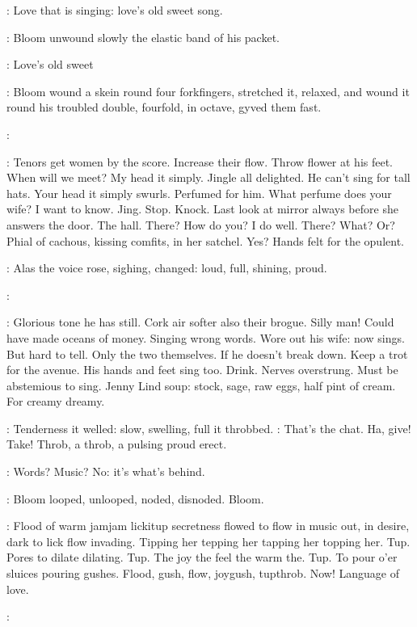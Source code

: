 \BloomInt:
Love that is singing: love's old sweet song.

:
Bloom unwound slowly
the elastic band of his packet.

\BloomInt:
Love's old sweet

:
Bloom
wound a skein round four forkfingers, stretched it, relaxed, and wound it
round his troubled double, fourfold, in octave, gyved them fast.

\simon:

\BloomInt:
Tenors get women by the score. Increase their flow. Throw flower at
his feet. When will we meet? My head it simply. Jingle all delighted. He
can't sing for tall hats. Your head it simply swurls. Perfumed for him.
What perfume does your wife? I want to know. Jing. Stop. Knock. Last look
at mirror always before she answers the door. The hall.
There? How do you?
I do well. There? What? Or? Phial of cachous, kissing comfits, in her
satchel. Yes? Hands felt for the opulent.

:
Alas the voice rose, sighing, changed: loud, full, shining, proud.

\simon:

\BloomInt:
Glorious tone he has still. Cork air softer also their brogue. Silly man!
Could have made oceans of money. Singing wrong words. Wore out his
wife: now sings. But hard to tell. Only the two themselves. If he doesn't
break down. Keep a trot for the avenue. His hands and feet sing too.
Drink. Nerves overstrung. Must be abstemious to sing. Jenny Lind soup:
stock, sage, raw eggs, half pint of cream.
For creamy dreamy.

:
Tenderness it welled: slow, swelling, full it throbbed.
\BloomInt:
That's the chat.
Ha, give! Take! Throb, a throb, a pulsing proud erect.

\BloomInt:
Words? Music? No: it's what's behind.

:
Bloom looped, unlooped, noded, disnoded. Bloom.

\BloomInt:
Flood of warm jamjam lickitup secretness flowed to flow in
music out, in desire, dark to lick flow invading. Tipping her tepping her
tapping her topping her. Tup. Pores to dilate dilating. Tup. The joy the
feel the warm the. Tup. To pour o'er sluices pouring gushes. Flood, gush,
flow, joygush, tupthrob. Now! Language of love.

\simon:

